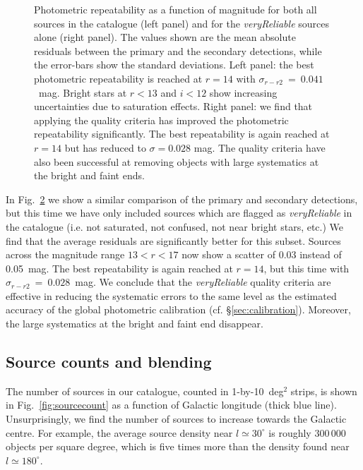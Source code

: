 \documentclass[useAMS,usenatbib]{mn2e}
\begin{document}
\begin{figure}
\begin{subfigure}[b]{0.45\linewidth}
\caption{}
\label{fig:pairmag_reliable}
\end{subfigure}
\caption{Photometric repeatability as a function of magnitude
         for both all sources in the catalogue (left panel)
         and for the \emph{veryReliable} sources alone (right panel).
         The values shown are the mean absolute residuals
         between the primary and the secondary detections,
         while the error-bars show the standard deviations.
         Left panel: 
         the best photometric repeatability is reached at $r=14$
         with $\sigma_{r-r2}~=~0.041$~mag.
         Bright stars at $r<13$ and $i<12$ 
         show increasing uncertainties due to saturation effects.
         Right panel: we find that applying the quality criteria
         has improved the photometric repeatability significantly.
         The best repeatability is again reached at $r=14$
         but has reduced to $\sigma=0.028$ mag.
         The quality criteria have also been successful
         at removing objects with large systematics at the bright
         and faint ends.
    }
\end{figure}

In Fig.~\ref{fig:pairmag_reliable} we show 
a similar comparison of the primary and secondary detections,
but this time we have only included sources which are flagged
as \emph{veryReliable} in the catalogue
(i.e. not saturated, not confused, not near bright stars, etc.)
We find that the average residuals are significantly better
for this subset. Sources across the magnitude range 
$13 < r < 17$ now show a scatter of 0.03 instead of 0.05~mag.
The best repeatability is again reached at $r=14$,
but this time with $\sigma_{r-r2}~=~0.028$~mag.
We conclude that the \emph{veryReliable} quality criteria are effective
in reducing the systematic errors to
the same level as the estimated accuracy of the
global photometric calibration (cf. \S\ref{sec:calibration}).
Moreover, the large systematics at the bright and faint end
disappear.

\subsection{Source counts and blending}
\label{sec:densities}

The number of sources in our catalogue,
counted in 1-by-10~deg$^2$ strips,
is shown in Fig.~\ref{fig:sourcecount}
as a function of Galactic longitude (thick blue line).	
Unsurprisingly, we find the number of sources
to increase towards the Galactic centre.
For example, the average source density near $l\simeq 30^\circ$
is roughly 300\,000 objects per square degree,
which is five times more than the density
found near $l\simeq 180^\circ$.
\end{document}
